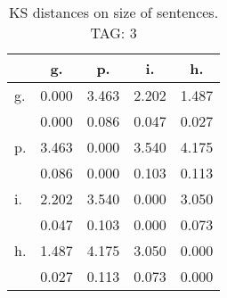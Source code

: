 \begin{table}[h!]
\begin{center}
\begin{tabular}{| l | c | c | c | c |}\hline
 & g. & p. & i. & h. \\\hline
g. & 0.000  & 3.463  & 2.202  & 1.487 \\\hline
 & 0.000  & 0.086  & 0.047  & 0.027 \\\hline
p. & 3.463  & 0.000  & 3.540  & 4.175 \\\hline
 & 0.086  & 0.000  & 0.103  & 0.113 \\\hline
i. & 2.202  & 3.540  & 0.000  & 3.050 \\\hline
 & 0.047  & 0.103  & 0.000  & 0.073 \\\hline
h. & 1.487  & 4.175  & 3.050  & 0.000 \\\hline
 & 0.027  & 0.113  & 0.073  & 0.000 \\\hline
\end{tabular}
\caption{KS distances on size of sentences. TAG: 3}
\end{center}
\end{table}